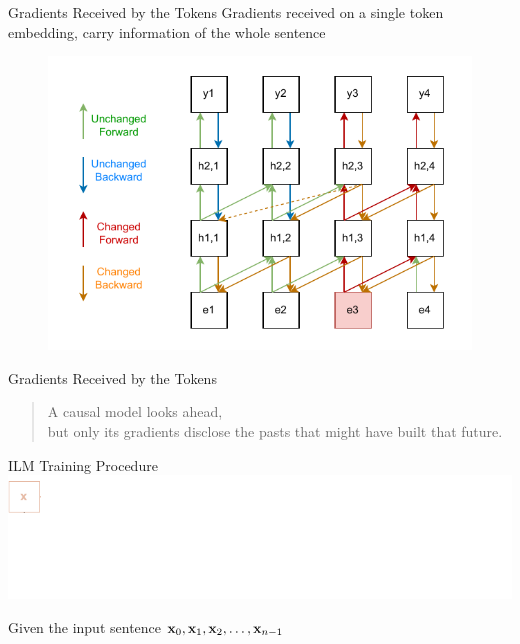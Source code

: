 \begin{frame}{Gradients Received by the Tokens}
    Gradients received on a single token embedding,
    carry information of the whole sentence

    \begin{figure}
        \centering
        \includegraphics[height=0.6\paperheight]{assets/llm_gradients_changing_embedding.drawio.pdf}
    \end{figure}
\end{frame}

\begin{frame}{Gradients Received by the Tokens}
    \begin{quote}
        \centering
        A causal model looks ahead, \\ but only its gradients disclose the pasts that might have built that future.
    \end{quote}
\end{frame}

\begin{frame}{ILM Training Procedure}
    \includegraphics[width=\linewidth]{assets/grad_lm_head_parallelism_0.drawio.pdf}
    \vspace{1.5cm}
    
    \centering
    Given the input sentence $\mathbf{x}_0, \mathbf{x}_1, \mathbf{x}_2, \dots, \mathbf{x}_{n-1}$
\end{frame}

